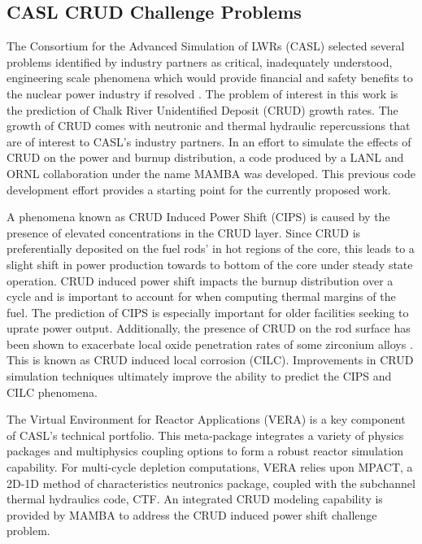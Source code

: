 \subsection{CASL CRUD Challenge Problems}

The Consortium for the Advanced Simulation of LWRs (CASL) selected several problems identified by industry partners as critical, inadequately understood, engineering scale phenomena which would provide
financial and safety benefits to the nuclear power industry if resolved \cite{Turinsky15}.
The problem of
interest in this work is the prediction of Chalk River Unidentified Deposit
(CRUD) growth rates.  The growth of CRUD comes with neutronic and thermal
hydraulic repercussions that are of interest to CASL's industry partners.
In an effort to simulate the
effects of CRUD on the power and burnup distribution, a code produced by a LANL
and ORNL collaboration \cite{collins16} under the name MAMBA was developed.
This previous code development effort provides a starting point for the currently proposed work.

A phenomena known as CRUD Induced Power Shift (CIPS) is caused by the presence
of elevated  concentrations in the CRUD layer.  Since CRUD is preferentially
deposited on the fuel rods' in hot regions of the core, this leads to a slight shift in
power production towards to bottom of the core under steady state operation.  
CRUD induced power shift impacts the burnup distribution over a cycle
and is important to account for when computing thermal
margins of the fuel.  The prediction
of CIPS is especially important for older facilities seeking to uprate power
output.  Additionally, the presence of CRUD on the rod surface has been shown
to exacerbate local oxide penetration rates of some zirconium alloys \cite{adamson07}.
This is known as CRUD induced local corrosion (CILC).  Improvements in CRUD
simulation techniques ultimately improve the ability to predict the CIPS and
CILC phenomena.

The Virtual Environment for Reactor Applications (VERA) is a key component of
CASL's technical portfolio.  This meta-package integrates a variety of physics
packages and multiphysics coupling options to form a robust reactor simulation
capability.  For multi-cycle depletion computations, VERA relies upon MPACT, a
2D-1D method of characteristics neutronics package, coupled with the subchannel
thermal hydraulics code, CTF.  An integrated CRUD modeling capability
is provided by MAMBA to address the CRUD induced power shift challenge problem.

